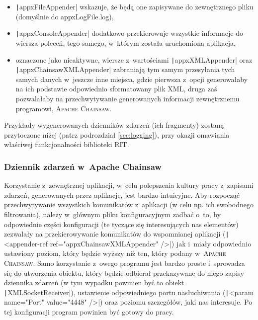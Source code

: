 \begin{itemize}
	\item \texttt|appxFileAppender| wskazuje, że będą one zapisywane do zewnętrznego pliku (domyślnie do \textsf{appxLogFile.log}),
	\item \texttt|appxConsoleAppender| dodatkowo przekierowuje wszystkie informacje do wiersza poleceń, tego samego, w~którym została uruchomiona aplikacja,
	\item oznaczone jako nieaktywne, wiersze z~wartościami \texttt|appxXMLAppender| oraz \texttt|appxChainsawXMLAppender| zabraniają tym samym przesyłania tych samych danych w~jeszcze inne miejsca, gdzie pierwsza z~opcji generowałaby na ich podstawie odpowiednio sformatowany plik \textsc{XML}, druga zaś pozwalałaby na przechwytywanie generowanych informacji zewnętrznemu programowi, \textsc{Apache Chainsaw}.
\end{itemize}

Przykłady wygenerowanych dzienników zdarzeń (ich fragmenty) zostaną przytoczone niżej (patrz podrozdział \ref{sec:logging}), przy okazji omawiania właściwej funkcjonalności biblioteki \textsc{RIT}.


\subsubsection{Dziennik zdarzeń w~Apache Chainsaw}


Korzystanie z~zewnętrznej aplikacji, w~celu polepszenia kultury pracy z~zapisami zdarzeń, generowanych przez aplikację, jest bardzo intuicyjne.
Aby rozpocząć przechwytywanie wszystkich komunikatów z~aplikacji (w celu np. ich swobodnego filtrowania), należy w~głównym pliku konfiguracyjnym zadbać o~to, by odpowiednie części konfiguracji (te tyczące się interesujących nas elementów) zezwalały na przekierowywanie komunikatów do wspomnianej aplikacji (\texttt|<appender-ref ref="appxChainsawXMLAppender" />|) jak i~miały odpowiednio ustawiony poziom, który będzie wyższy niż ten, który podany w~\textsc{Apache Chainsaw}.
Samo korzystanie z~owego programu jest bardzo proste i~sprowadza się do utworzenia obiektu, który będzie odbierał przekazywane do niego zapisy dziennika zdarzeń (w tym wypadku powinien być to obiekt \texttt|XMLSocketReceiver|), ustawienie odpowiedniego portu nasłuchiwania (\texttt|<param name="Port" value="4448" />|) oraz poziomu szczegółów, jaki nas interesuje.
Po tej konfiguracji program powinien być gotowy do pracy.



